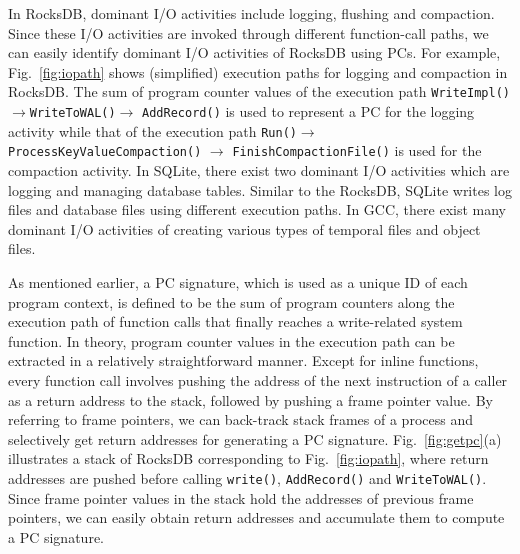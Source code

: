 In RocksDB, dominant I/O activities include logging, flushing and compaction.
Since these I/O activities are invoked through different function-call paths,
we can easily identify dominant I/O activities of RocksDB using PCs.  For
example, Fig.~\ref{fig:iopath} shows (simplified) execution paths for logging
and compaction in RocksDB.  The sum of program counter values of the execution
path \texttt{WriteImpl()}$\rightarrow$\texttt{WriteToWAL()}$\rightarrow$
\texttt{AddRecord()} is used to represent a PC for the logging activity while
that of the execution path \texttt{Run()}$\rightarrow$
\texttt{ProcessKeyValueCompaction()} $\rightarrow$
\texttt{FinishCompactionFile()} is used for the compaction activity.
In SQLite, there exist two dominant I/O activities which are logging and
managing database tables.  Similar to the RocksDB, SQLite writes log files and
database files using different execution paths.  In GCC, there exist many
dominant I/O activities of creating various types of temporal files and object
files.


As mentioned earlier, a PC signature, which is used as a unique ID of each
program context, is defined to be the sum of program counters along the
execution path of function calls that finally reaches a write-related system
function.  In theory, program counter values in the execution path can be
extracted in a relatively straightforward manner.  Except for inline functions,
every function call involves pushing the address of the next instruction of a
caller as a return address to the stack, followed by pushing a frame pointer
value.  By referring to frame pointers, we can back-track stack frames of a
process and selectively get return addresses for generating a PC signature.
Fig.~\ref{fig:getpc}(a) illustrates a stack of RocksDB corresponding to
Fig.~\ref{fig:iopath}, where return addresses are pushed before calling
\texttt{write()}, \texttt{AddRecord()} and \texttt{WriteToWAL()}.  Since frame
pointer values in the stack hold the addresses of previous frame pointers, we
can easily obtain return addresses and accumulate them to compute a PC signature.  


